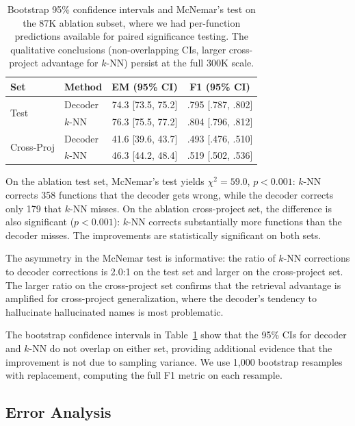 \documentclass[sigconf,nonacm]{acmart}
\begin{document}
\begin{table}[t]
    \centering
    \caption{Bootstrap 95\% confidence intervals and McNemar's test on the 87K ablation subset, where we had per-function predictions available for paired significance testing. The qualitative conclusions (non-overlapping CIs, larger cross-project advantage for $k$-NN) persist at the full 300K scale.}
    \label{tab:significance}
    \footnotesize
    \begin{tabular}{llcc}
        \toprule
        \textbf{Set} & \textbf{Method} & \textbf{EM (95\% CI)} & \textbf{F1 (95\% CI)} \\
        \midrule
        \multirow{2}{*}{Test} & Decoder & 74.3 [73.5, 75.2] & .795 [.787, .802] \\
         & $k$-NN & 76.3 [75.5, 77.2] & .804 [.796, .812] \\
        \midrule
        \multirow{2}{*}{Cross-Proj} & Decoder & 41.6 [39.6, 43.7] & .493 [.476, .510] \\
         & $k$-NN & 46.3 [44.2, 48.4] & .519 [.502, .536] \\
        \bottomrule
    \end{tabular}
\end{table}

On the ablation test set, McNemar's test yields $\chi^2{=}59.0$, $p{<}0.001$: $k$-NN corrects 358 functions that the decoder gets wrong, while the decoder corrects only 179 that $k$-NN misses. On the ablation cross-project set, the difference is also significant ($p{<}0.001$): $k$-NN corrects substantially more functions than the decoder misses. The improvements are statistically significant on both sets.

The asymmetry in the McNemar test is informative: the ratio of $k$-NN corrections to decoder corrections is 2.0:1 on the test set and larger on the cross-project set. The larger ratio on the cross-project set confirms that the retrieval advantage is amplified for cross-project generalization, where the decoder's tendency to hallucinate hallucinated names is most problematic.

The bootstrap confidence intervals in Table~\ref{tab:significance} show that the 95\% CIs for decoder and $k$-NN do not overlap on either set, providing additional evidence that the improvement is not due to sampling variance. We use 1,000 bootstrap resamples with replacement, computing the full F1 metric on each resample.

\subsection{Error Analysis}
\end{document}
